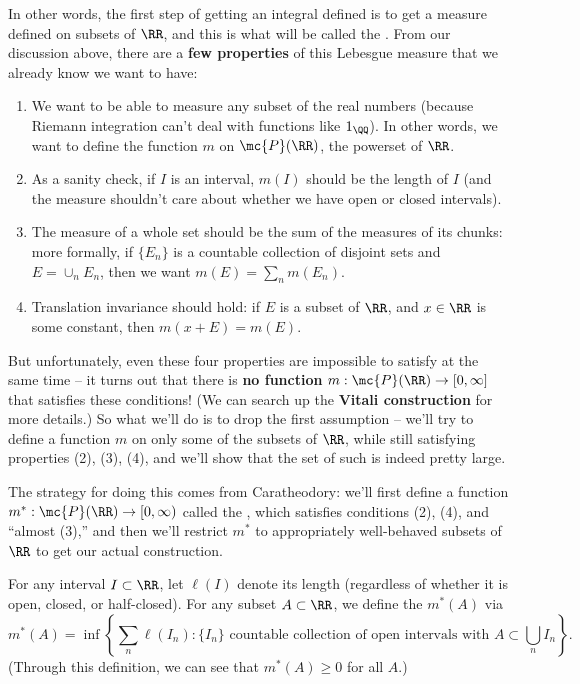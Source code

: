 In other words, the first step of getting an integral defined is to get a measure defined on subsets of $\RR$, and this is what will be called the . From our discussion above, there are a \textbf{few properties} of this Lebesgue measure that we already know we want to have:

\begin{enumerate}
\item We want to be able to measure any subset of the real numbers (because Riemann integration can't deal with functions like $1_{\QQ}$). In other words, we want to define the function $m$ on $\mc{P}(\RR)$, the powerset of $\RR$.
\item As a sanity check, if $I$ is an interval, $m(I)$ should be the length of $I$ (and the measure shouldn't care about whether we have open or closed intervals). 
\item The measure of a whole set should be the sum of the measures of its chunks: more formally, if $\{E_n\}$ is a countable collection of disjoint sets and $E = \cup_n E_n$, then we want $m(E) = \sum_{n} m(E_n)$.
\item Translation invariance should hold: if $E$ is a subset of $\RR$, and $x \in \RR$ is some constant, then $m(x+E) = m(E)$.
\end{enumerate}

But unfortunately, even these four properties are impossible to satisfy at the same time -- it turns out that there is \textbf{no function} $m: \mc{P}(\RR) \to [0, \infty]$ that satisfies these conditions! (We can search up the \textbf{Vitali construction} for more details.) So what we'll do is to drop the first assumption -- we'll try to define a function $m$ on only some of the subsets of $\RR$, while still satisfying properties (2), (3), (4), and we'll show that the set of such  is indeed pretty large.

The strategy for doing this comes from Caratheodory: we'll first define a function $m^\ast: \mc{P}(\RR) \to [0, \infty)$ called the , which satisfies conditions (2), (4), and ``almost (3),'' and then we'll restrict $m^\ast$ to appropriately well-behaved subsets of $\RR$ to get our actual construction. 

\begin{definition}
For any interval $I \subset \RR$, let $\ell(I)$ denote its length (regardless of whether it is open, closed, or half-closed). For any subset $A \subset \RR$, we define the  $m^\ast(A)$ via
\[
    m^\ast(A) = \inf\left\{\sum_n \ell(I_n): \{I_n\} \text{ countable collection of open intervals with }A \subset \bigcup_n I_n\right\}.
\]
(Through this definition, we can see that $m^\ast(A) \ge 0$ for all $A$.)
\end{definition}

